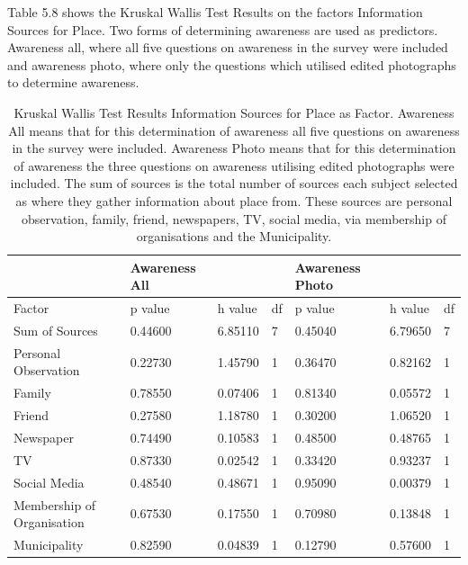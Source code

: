Table 5.8 shows the Kruskal Wallis Test Results on the factors Information Sources for Place. Two forms of determining awareness are used as predictors. Awareness all, where all five questions on awareness in the survey were included and awareness photo, where only the questions which utilised edited photographs to determine awareness.

\begin{table}[H]
    \centering
    \begin{tabular}{|l|l|l|l|l|l|l|}
    \hline
       & \textbf{Awareness All} & ~ & ~ & \textbf{Awareness Photo} & ~ & ~ \\ \hline
       Factor & p value & h value & df & p value & h value & df \\ \hline
        Sum of Sources  & 0.44600 & 6.85110 & 7 & 0.45040 & 6.79650 & 7 \\ \hline
        Personal Observation & 0.22730 & 1.45790 & 1 & 0.36470 & 0.82162 & 1 \\ \hline
        Family & 0.78550 & 0.07406 & 1 & 0.81340 & 0.05572 & 1 \\ \hline
        Friend & 0.27580 & 1.18780 & 1 & 0.30200 & 1.06520 & 1 \\ \hline
        Newspaper & 0.74490 & 0.10583 & 1 & 0.48500 & 0.48765 & 1 \\ \hline
        TV & 0.87330 & 0.02542 & 1 & 0.33420 & 0.93237 & 1 \\ \hline
        Social Media & 0.48540 & 0.48671 & 1 & 0.95090 & 0.00379 & 1 \\ \hline
        Membership of Organisation  & 0.67530 & 0.17550 & 1 & 0.70980 & 0.13848 & 1 \\ \hline
        Municipality & 0.82590 & 0.04839 & 1 & 0.12790 & 0.57600 & 1 \\ \hline
        \hline
    \end{tabular}
    \caption{Kruskal Wallis Test Results Information Sources for Place as Factor. Awareness All means that for this determination of awareness all five questions on awareness in the survey were included. Awareness Photo means that for this determination of awareness the three questions on awareness utilising edited photographs were included. The sum of sources is the total number of sources each subject selected as where they gather information about place from. These sources are personal observation, family, friend, newspapers, TV, social media, via membership of organisations and the Municipality. }
    \label{Kruskal_wallis_test_information}
\end{table}


